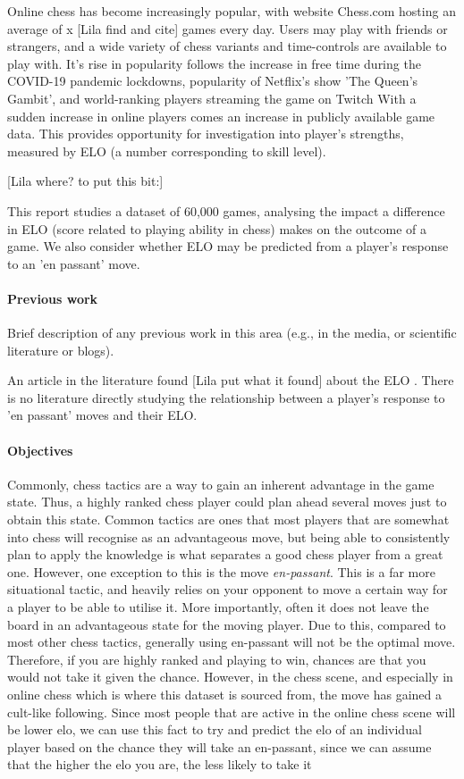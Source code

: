 \documentclass[10pt,a4paper,twocolumn]{article}
\begin{document}
Online chess has become increasingly popular, with website Chess.com hosting an average of x [Lila find and cite] games every day. Users may play with friends or strangers, and a wide variety of chess variants and time-controls are available to play with. It's rise in popularity follows the increase in free time during the COVID-19 pandemic lockdowns, popularity of Netflix's show 'The Queen's Gambit', and world-ranking players streaming the game on Twitch \cite{The2020ChessBoom} With a sudden increase in online players comes an increase in publicly available game data. This provides opportunity for investigation into player's strengths, measured by ELO (a number corresponding to skill level).

[Lila where? to put this bit:]

This report studies a dataset of 60,000 games, analysing the impact a difference in ELO (score related to playing ability in chess) makes on the outcome of a game. We also consider whether ELO may be predicted from a player's response to an 'en passant' move.

\paragraph{Previous work}

Brief description of any previous work in this area (e.g., in the
media, or scientific literature or blogs).

An article in the literature found [Lila put what it found] about the ELO \cite{HowMuchDoesEloMatter}.
There is no literature directly studying the relationship between a player's response to 'en passant' moves and their ELO.
\paragraph{Objectives}

Commonly, chess tactics are a way to gain an inherent advantage in the game state. Thus, a highly ranked chess player could plan ahead several moves just to obtain this state. Common tactics are ones that most players that are somewhat into chess will recognise as an advantageous move, but being able to consistently plan to apply the knowledge is what separates a good chess player from a great one. However, one exception to this is the move \textit{en-passant}. This is a far more situational tactic, and heavily relies on your opponent to move a certain way for a player to be able to utilise it. More importantly, often it does not leave the board in an advantageous state for the moving player. Due to this, compared to most other chess tactics, generally using en-passant will not be the optimal move. Therefore, if you are highly ranked and playing to win, chances are that you would not take it given the chance. However, in the chess scene, and especially in online chess which is where this dataset is sourced from, the move has gained a cult-like following. Since most people that are active in the online chess scene will be lower elo, we can use this fact to try and predict the elo of an individual player based on the chance they will take an en-passant, since we can assume that the higher the elo you are, the less likely to take it
\end{document}
